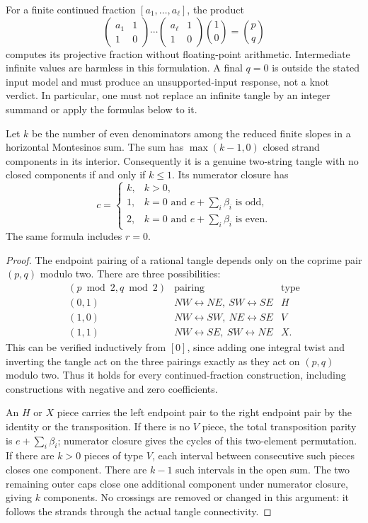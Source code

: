 For a finite continued fraction $[a_1,\ldots,a_\ell]$, the product
\[
 \begin{pmatrix}a_1&1\\1&0\end{pmatrix}\cdots
 \begin{pmatrix}a_\ell&1\\1&0\end{pmatrix}
 \binom10=\binom pq
\]
computes its projective fraction without floating-point arithmetic.  Intermediate
infinite values are harmless in this formulation.  A final $q=0$ is outside
the stated input model and must produce an unsupported-input response, not a
knot verdict.  In particular, one must not replace an infinite tangle by an
integer summand or apply the formulas below to it.

\begin{lemma}\label{lem:mon:parity}
Let $k$ be the number of even denominators among the reduced finite slopes in
a horizontal Montesinos sum.  The sum has $\max(k-1,0)$ closed strand
components in its interior.  Consequently it is a genuine two-string tangle
with no closed components if and only if $k\le1$.
Its numerator closure has
\[
 c=\begin{cases}
 k,&k>0,\\
 1,&k=0\text{ and }e+\sum_i\beta_i\text{ is odd},\\
 2,&k=0\text{ and }e+\sum_i\beta_i\text{ is even}.
 \end{cases}
\]
The same formula includes $r=0$.
\end{lemma}

\begin{proof}
The endpoint pairing of a rational tangle depends only on the coprime pair
$(p,q)$ modulo two.  There are three possibilities:
\[
\begin{array}{c|c|c}
(p\bmod2,q\bmod2)&\text{pairing}&\text{type}\\\hline
(0,1)&NW\!\leftrightarrow\!NE,\ SW\!\leftrightarrow\!SE&H\\
(1,0)&NW\!\leftrightarrow\!SW,\ NE\!\leftrightarrow\!SE&V\\
(1,1)&NW\!\leftrightarrow\!SE,\ SW\!\leftrightarrow\!NE&X.
\end{array}
\]
This can be verified inductively from $[0]$, since adding one integral twist
and inverting the tangle act on the three pairings exactly as they act on
$(p,q)$ modulo two.  Thus it holds for every continued-fraction construction,
including constructions with negative and zero coefficients.

An $H$ or $X$ piece carries the left endpoint pair to the right endpoint pair
by the identity or the transposition.  If there is no $V$ piece, the total
transposition parity is $e+\sum_i\beta_i$; numerator closure gives the cycles
of this two-element permutation.  If there are $k>0$ pieces of type $V$,
each interval between consecutive such pieces closes one component.  There
are $k-1$ such intervals in the open sum.  The two remaining outer caps
close one additional component under numerator closure, giving $k$ components.
No crossings are removed or changed in this argument: it follows the strands
through the actual tangle connectivity.
\end{proof}

